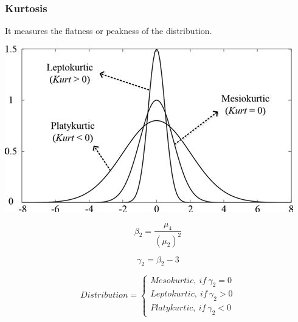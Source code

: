 \documentclass[11pt,letterpaper]{article}
\begin{document}
\subsubsection{Kurtosis}

It measures the flatness or peakness of the distribution. 

\vspace{1cm}

\includegraphics[width = \textwidth]{figs/Pasted image (2).png}

\[
  \beta_2 = \frac{\mu_4 }{(\mu_2)^2}
\]


\[
  \gamma_2 = \beta_2 - 3
\]

\[
  Distribution = \begin{cases}
    Mesokurtic,\ if\ \gamma_2 = 0\\
    Leptokurtic,\ if\ \gamma_2 > 0\\
    Platykurtic,\ if\ \gamma_2 < 0
  \end{cases}
\]
\end{document}
